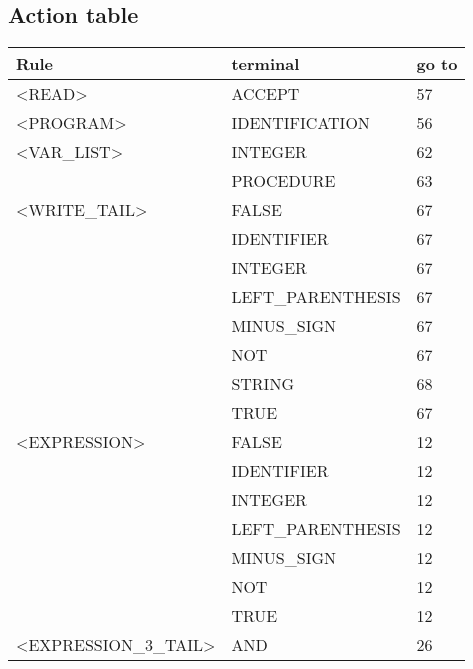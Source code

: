 \newpage\cleardoublepage{}
\subsection{Action table}



\begin{longtable}{|l|l|l|}

\hline

\textbf{Rule}               &   \textbf{terminal}           &   \textbf{go to} \\ \hline
<READ>               &   ACCEPT               &   57 \\ \hline
<PROGRAM>            &   IDENTIFICATION       &   56 \\ \hline
<VAR\_LIST>           &   INTEGER              &   62 \\ \hline
                     &   PROCEDURE            &   63 \\ \hline
<WRITE\_TAIL>         &   FALSE                &   67 \\ \hline
                     &   IDENTIFIER           &   67 \\ \hline
                     &   INTEGER              &   67 \\ \hline
                     &   LEFT\_PARENTHESIS     &   67 \\ \hline
                     &   MINUS\_SIGN           &   67 \\ \hline
                     &   NOT                  &   67 \\ \hline
                     &   STRING               &   68 \\ \hline
                     &   TRUE                 &   67 \\ \hline
<EXPRESSION>         &   FALSE                &   12 \\ \hline
                     &   IDENTIFIER           &   12 \\ \hline
                     &   INTEGER              &   12 \\ \hline
                     &   LEFT\_PARENTHESIS     &   12 \\ \hline
                     &   MINUS\_SIGN           &   12 \\ \hline
                     &   NOT                  &   12 \\ \hline
                     &   TRUE                 &   12 \\ \hline
<EXPRESSION\_3\_TAIL>  &   AND                 &   26 \\ \hline

\end{longtable}
